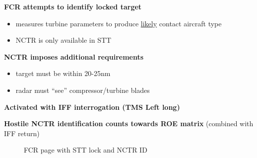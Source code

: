 \begin{tcoloritemize}
{    \begin{subitemize}
        \item \textbf{FCR attempts to identify locked target}
        \begin{itemize}
            \item measures turbine parameters to produce \underline{likely} contact aircraft type
            \item NCTR is only available in STT
        \end{itemize}
        \item \textbf{NCTR imposes additional requirements}
        \begin{itemize}
            \item target must be within 20-25nm
            \item radar must ``see'' compressor/turbine blades
        \end{itemize}
        \item \textbf{Activated with IFF interrogation (TMS Left long)}
        \item \textbf{Hostile NCTR identification counts towards ROE matrix} (combined with IFF return)
    \end{subitemize}}
\end{tcoloritemize}

\begin{figure}[htbp]
    \centering
    \caption{FCR page with STT lock and NCTR ID}
\end{figure}

